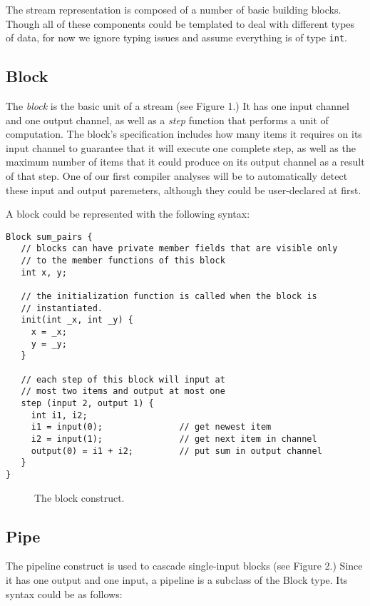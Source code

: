 The stream representation is composed of a number of basic building
blocks.  Though all of these components could be templated to deal with
different types of data, for now we ignore typing issues and assume
everything is of type {\tt int}.

\subsection{Block}

The {\em block} is the basic unit of a stream (see Figure 1.)  It has
one input channel and one output channel, as well as a {\em step}
function that performs a unit of computation.  The block's specification
includes how many items it requires on its input channel to guarantee
that it will execute one complete step, as well as the maximum number of
items that it could produce on its output channel as a result of that
step.  One of our first compiler analyses will be to automatically
detect these input and output paremeters, although they could be
user-declared at first.

A block could be represented with the following syntax:

\begin{verbatim}
Block sum_pairs {
   // blocks can have private member fields that are visible only
   // to the member functions of this block
   int x, y;

   // the initialization function is called when the block is 
   // instantiated.
   init(int _x, int _y) {
     x = _x;
     y = _y;
   }

   // each step of this block will input at 
   // most two items and output at most one
   step (input 2, output 1) {
     int i1, i2;
     i1 = input(0);               // get newest item
     i2 = input(1);               // get next item in channel
     output(0) = i1 + i2;         // put sum in output channel
   }
}
\end{verbatim}

\begin{figure}[t]
\centerline{}
\vspace{-24pt}
\caption{\protect\small The block construct.}
\end{figure}

\subsection{Pipe}

The pipeline construct is used to cascade single-input blocks (see
Figure 2.)  Since it has one output and one input, a pipeline is a
subclass of the Block type. Its syntax could be as follows:

